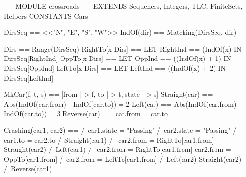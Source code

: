 \documentclass[14pt, openany]{book}
\begin{document}
\begin{tla}
  ---- MODULE crossroads ----
EXTENDS Sequences, Integers, TLC, FiniteSets, Helpers
CONSTANTS Cars

DirsSeq == <<"N", "E", "S", "W">>
IndOf(dir) == Matching(DirsSeq, dir)

Dirs == Range(DirsSeq)
RightTo[x \in Dirs] == 
  LET RightInd == (IndOf(x) %
  IN DirsSeq[RightInd]
OppTo[x \in Dirs] ==
  LET OppInd == ((IndOf(x) + 1) %
  IN DirsSeq[OppInd]
LeftTo[x \in Dirs] == 
  LET LeftInd == ((IndOf(x) + 2) %
  IN DirsSeq[LeftInd] 

MkCar(f, t, s) == [from |-> f, to |-> t, state |-> s]
Straight(car) == Abs(IndOf(car.from) - IndOf(car.to)) = 2
Left(car) == Abs(IndOf(car.from) - IndOf(car.to)) = 3
Reverse(car) == car.from = car.to
  
Crashing(car1, car2) == 
  /\ car1.state = "Passing" 
  /\ car2.state = "Passing" 
  /\ \/ car1.to = car2.to  
     \/ /\ Straight(car1) 
        /\ \/ car2.from = RightTo[car1.from] 
           \/ Straight(car2)
     \/ /\ Left(car1)
        /\ \/ car2.from = RightTo[car1.from]
           \/ car2.from = OppTo[car1.from]
           \/ /\ car2.from = LeftTo[car1.from]
              /\ Left(car2) \/ Straight(car2)
     \/ /\ Reverse(car1)     
\end{tla}
\end{document}
